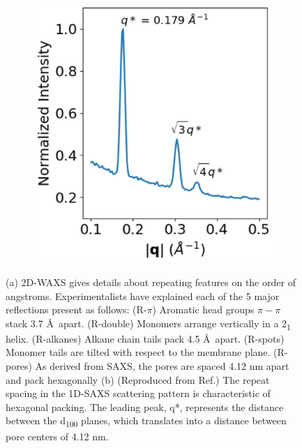 \documentclass[journal=jpcbfk,manuscript=article]{achemso}
\begin{document}
\begin{figure}[!htb]
\begin{subfigure}[t]{0.38\linewidth}
                \includegraphics[width=\textwidth]{SAXS.pdf}
                \caption{}\label{fig:SAXS}
        \end{subfigure}
	\caption{(a) 2D-WAXS gives details about repeating features on the
		order of angstroms. Experimentalists have explained each of the 5 major
		reflections present as follows: (R-$\pi$) Aromatic head groups $\pi-\pi$ stack
		3.7 \AA~apart. (R-double) Monomers arrange vertically in a 2\textsubscript{1}
		helix. (R-alkanes) Alkane chain tails pack 4.5 \AA~apart. (R-spots) Monomer
		tails are tilted with respect to the membrane plane. (R-pores) As derived from
		SAXS, the pores are spaced 4.12 nm apart and pack hexagonally (b) (Reproduced
		from Ref.) The repeat spacing in the 1D-SAXS
		scattering pattern is characteristic of hexagonal packing. The leading peak,
		q*, represents the distance between the d\textsubscript{100} planes, which translates 
                into a distance between pore centers of 4.12 nm.} 
	\label{fig:SWAXS}
 \end{figure}
  
\end{document}

